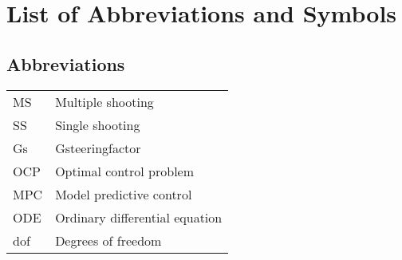 \documentclass[master=wtk,english]{kulemt}
\begin{document}
\begin{abstract*}
  

\end{abstract*}

\listoffiguresandtables
\chapter{List of Abbreviations and Symbols}
\section*{Abbreviations}
\begin{flushleft}
  \renewcommand{\arraystretch}{1.1}
  \begin{tabularx}{\textwidth}{@{}p{12mm}X@{}}
    MS   & Multiple shooting  \\
    SS   & Single shooting  \\
    Gs   & Gsteeringfactor  \\
    OCP  & Optimal control problem\\
    MPC  & Model predictive control\\
    ODE  & Ordinary differential equation\\
    dof  & Degrees of freedom
  \end{tabularx}
\end{flushleft}
\end{document}
